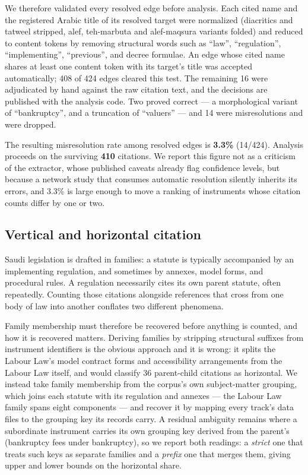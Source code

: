 \documentclass[sn-basic]{sn-jnl}%
\begin{document}
We therefore validated every resolved edge before analysis. Each cited name
and the registered Arabic title of its resolved target were normalized
(diacritics and tatweel stripped, alef, teh-marbuta and alef-maqsura
variants folded) and reduced to content tokens by removing structural words
such as ``law'', ``regulation'', ``implementing'', ``previous'', and decree
formulae. An edge whose cited name shares at least one content token with
its target's title was accepted automatically; 408 of 424 edges cleared this
test. The remaining 16 were adjudicated by hand against the raw citation
text, and the decisions are published with the analysis code. Two proved
correct --- a morphological variant of ``bankruptcy'', and a truncation of
``valuers'' --- and 14 were misresolutions and were dropped.

The resulting misresolution rate among resolved edges is \textbf{3.3\%}
(14/424). Analysis proceeds on the surviving \textbf{410} citations. We
report this figure not as a criticism of the extractor, whose published
caveats already flag confidence levels, but because a network study that
consumes automatic resolution silently inherits its errors, and 3.3\% is
large enough to move a ranking of instruments whose citation counts differ
by one or two.

\subsection{Vertical and horizontal citation}
\label{sec:vh}

Saudi legislation is drafted in families: a statute is typically accompanied
by an implementing regulation, and sometimes by annexes, model forms, and
procedural rules. A regulation necessarily cites its own parent statute,
often repeatedly. Counting those citations alongside references that cross
from one body of law into another conflates two different phenomena.

Family membership must therefore be recovered before anything is counted,
and how it is recovered matters. Deriving families by stripping structural
suffixes from instrument identifiers is the obvious approach and it is
wrong: it splits the Labour Law's model contract forms and accessibility
arrangements from the Labour Law itself, and would classify 36 parent-child
citations as horizontal. We instead take family membership from the corpus's
own subject-matter grouping, which joins each statute with its regulation
and annexes --- the Labour Law family spans eight components --- and recover
it by mapping every track's data files to the grouping key its records
carry. A residual ambiguity remains where a subordinate instrument carries
its own grouping key derived from the parent's (bankruptcy fees under
bankruptcy), so we report both readings: a \emph{strict} one that treats such
keys as separate families and a \emph{prefix} one that merges them, giving
upper and lower bounds on the horizontal share.
\end{document}

